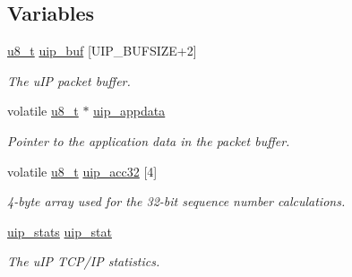 \subsection*{Variables}
\begin{CompactItemize}
\item 
\hyperlink{a00070_ge081489b4906f65a3cb18e9fbe9f8d23}{u8\_\-t} \hyperlink{a00063_gb81e78f890dbbee50c533a9734b74fd9}{uip\_\-buf} \mbox{[}UIP\_\-BUFSIZE+2\mbox{]}
\begin{CompactList}\small\item\em The u\-IP packet buffer. \item\end{CompactList}\item 
volatile \hyperlink{a00070_ge081489b4906f65a3cb18e9fbe9f8d23}{u8\_\-t} $\ast$ \hyperlink{a00059_ge71ae1aa130be22a5f028e76d8d1e31e}{uip\_\-appdata}
\begin{CompactList}\small\item\em Pointer to the application data in the packet buffer. \item\end{CompactList}\item 
\hypertarget{a00066_g838108341703d67d15fc09e0808c2561}{
volatile \hyperlink{a00070_ge081489b4906f65a3cb18e9fbe9f8d23}{u8\_\-t} \hyperlink{a00066_g838108341703d67d15fc09e0808c2561}{uip\_\-acc32} \mbox{[}4\mbox{]}}
\label{a00066_g838108341703d67d15fc09e0808c2561}

\begin{CompactList}\small\item\em 4-byte array used for the 32-bit sequence number calculations. \item\end{CompactList}\item 
\hyperlink{a00031}{uip\_\-stats} \hyperlink{a00059_g9ee50a40597e67fce96541ab56c3b712}{uip\_\-stat}
\begin{CompactList}\small\item\em The u\-IP TCP/IP statistics. \item\end{CompactList}\end{CompactItemize}
